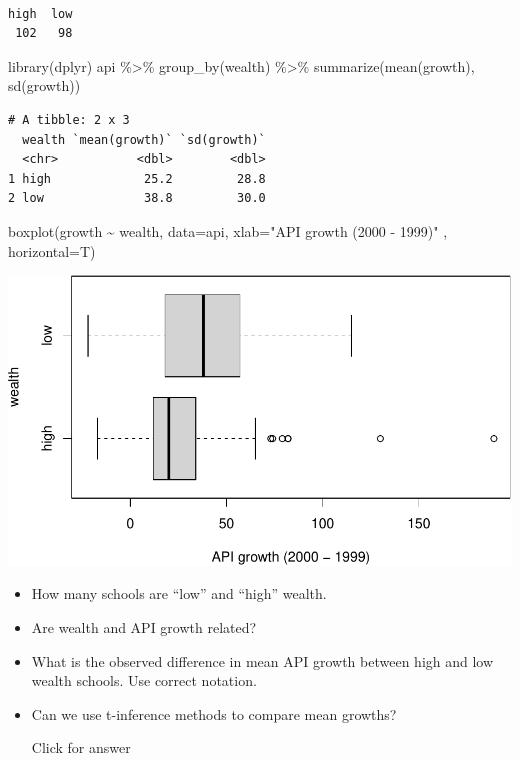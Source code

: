 \documentclass[
]{book}
\newenvironment{Shaded}{\begin{snugshade}}{\end{snugshade}}
\newcommand{\AttributeTok}[1]{\textcolor[rgb]{0.77,0.63,0.00}{#1}}
\newcommand{\FunctionTok}[1]{\textcolor[rgb]{0.00,0.00,0.00}{#1}}
\newcommand{\NormalTok}[1]{#1}
\newcommand{\SpecialCharTok}[1]{\textcolor[rgb]{0.00,0.00,0.00}{#1}}
\newcommand{\StringTok}[1]{\textcolor[rgb]{0.31,0.60,0.02}{#1}}
\providecommand{\tightlist}{%
  \setlength{\itemsep}{0pt}\setlength{\parskip}{0pt}}
\begin{document}
\begin{verbatim}

high  low 
 102   98 
\end{verbatim}

\begin{Shaded}
\begin{Highlighting}[]
\FunctionTok{library}\NormalTok{(dplyr)}
\NormalTok{api }\SpecialCharTok{\%\textgreater{}\%} \FunctionTok{group\_by}\NormalTok{(wealth) }\SpecialCharTok{\%\textgreater{}\%} \FunctionTok{summarize}\NormalTok{(}\FunctionTok{mean}\NormalTok{(growth), }\FunctionTok{sd}\NormalTok{(growth))}
\end{Highlighting}
\end{Shaded}

\begin{verbatim}
# A tibble: 2 x 3
  wealth `mean(growth)` `sd(growth)`
  <chr>           <dbl>        <dbl>
1 high             25.2         28.8
2 low              38.8         30.0
\end{verbatim}

\begin{Shaded}
\begin{Highlighting}[]
\FunctionTok{boxplot}\NormalTok{(growth }\SpecialCharTok{\textasciitilde{}}\NormalTok{ wealth, }\AttributeTok{data=}\NormalTok{api, }\AttributeTok{xlab=}\StringTok{"API growth (2000 {-} 1999)"}\NormalTok{ , }\AttributeTok{horizontal=}\NormalTok{T)}
\end{Highlighting}
\end{Shaded}

\includegraphics[width=1\linewidth]{Class_Activity_18_files/figure-latex/unnamed-chunk-9-1}

\begin{itemize}
\tightlist
\item
  How many schools are ``low'' and ``high'' wealth.
\item
  Are wealth and API growth related?
\item
  What is the observed difference in mean API growth between high and low wealth schools. Use correct notation.
\item
  Can we use t-inference methods to compare mean growths?

  Click for answer
\end{itemize}
\end{document}
